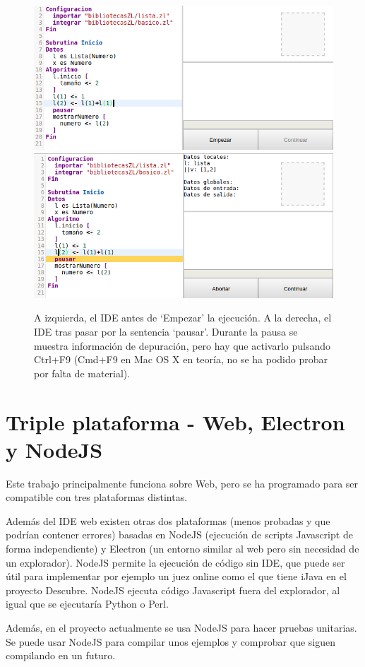 \documentclass{report}
\begin{document}
	
	
\begin{figure}
\centering
\includegraphics[width=0.45\linewidth]{pausa1}
\includegraphics[width=0.45\linewidth]{pausa2}
\caption[Ejemplo de uso de pausa (breakpoint).]{A izquierda, el IDE antes de `Empezar' la ejecución. A la derecha, el IDE tras pasar por la sentencia `pausar'. Durante la pausa se muestra información de depuración, pero hay que activarlo pulsando Ctrl+F9 (Cmd+F9 en Mac OS X en teoría, no se ha podido probar por falta de material).}
\label{fig:pausa1}
\end{figure}
	
	\section{Triple plataforma - Web, Electron y NodeJS}
	
	
	Este trabajo principalmente funciona sobre Web, pero se ha programado para ser compatible con tres plataformas distintas. 
	
	Además del IDE web existen otras dos plataformas (menos probadas y que podrían contener errores) basadas en NodeJS (ejecución de scripts Javascript de forma independiente) y Electron (un entorno similar al web pero sin necesidad de un explorador). NodeJS permite la ejecución de código sin IDE, que puede ser útil para implementar por ejemplo un juez online como el que tiene iJava en el proyecto Descubre. NodeJS ejecuta código Javascript fuera del explorador, al igual que se ejecutaría Python o Perl. 
	
	\vspace{10px}
	
	Además, en el proyecto actualmente se usa NodeJS para hacer pruebas unitarias. Se puede usar NodeJS para compilar unos ejemplos y comprobar que siguen compilando en un futuro. 
	
\end{document}
